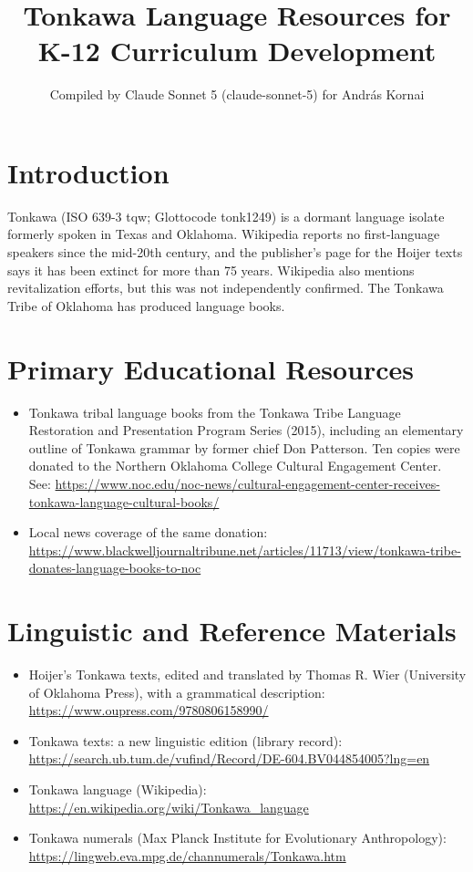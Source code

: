 \documentclass[12pt]{article}
\title{Tonkawa Language Resources for K-12 Curriculum Development}
\author{Compiled by Claude Sonnet 5 (claude-sonnet-5) for Andr\'as Kornai}
\date{}
\begin{document}
\maketitle

\section{Introduction}
Tonkawa (ISO 639-3 tqw; Glottocode tonk1249) is a dormant language isolate formerly spoken in Texas and Oklahoma. Wikipedia reports no first-language speakers since the mid-20th century, and the publisher's page for the Hoijer texts says it has been extinct for more than 75 years. Wikipedia also mentions revitalization efforts, but this was not independently confirmed. The Tonkawa Tribe of Oklahoma has produced language books.

\section{Primary Educational Resources}
\begin{itemize}
\item Tonkawa tribal language books from the Tonkawa Tribe Language Restoration and Presentation Program Series (2015), including an elementary outline of Tonkawa grammar by former chief Don Patterson. Ten copies were donated to the Northern Oklahoma College Cultural Engagement Center. See: \url{https://www.noc.edu/noc-news/cultural-engagement-center-receives-tonkawa-language-cultural-books/}
\item Local news coverage of the same donation: \url{https://www.blackwelljournaltribune.net/articles/11713/view/tonkawa-tribe-donates-language-books-to-noc}
\end{itemize}

\section{Linguistic and Reference Materials}
\begin{itemize}
\item Hoijer's Tonkawa texts, edited and translated by Thomas R. Wier (University of Oklahoma Press), with a grammatical description: \url{https://www.oupress.com/9780806158990/}
\item Tonkawa texts: a new linguistic edition (library record): \url{https://search.ub.tum.de/vufind/Record/DE-604.BV044854005?lng=en}
\item Tonkawa language (Wikipedia): \url{https://en.wikipedia.org/wiki/Tonkawa_language}
\item Tonkawa numerals (Max Planck Institute for Evolutionary Anthropology): \url{https://lingweb.eva.mpg.de/channumerals/Tonkawa.htm}
\end{itemize}
\end{document}
